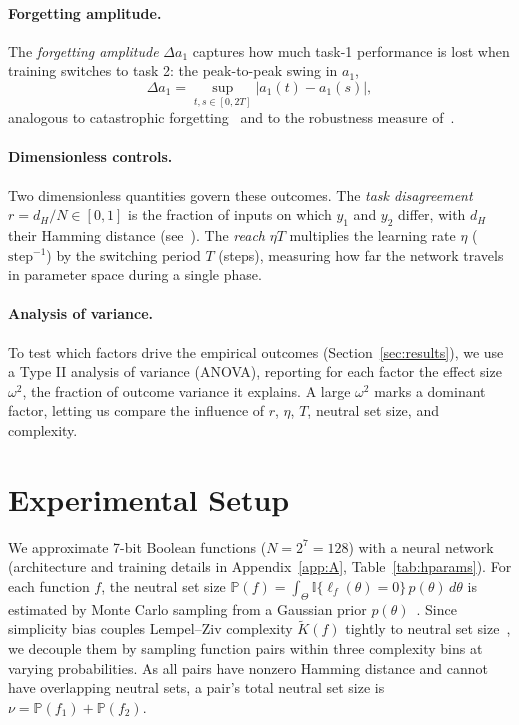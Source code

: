 \documentclass[pmlr]{jmlr} %
\begin{document}
\paragraph{Forgetting amplitude.} The \emph{forgetting amplitude} $\Delta a_1$ captures how much task-1 performance is lost when training switches to task 2: the peak-to-peak swing in $a_1$,
\[
    \Delta a_1 = \sup_{t,s\in[0,2T]}|a_1(t)-a_1(s)|,
\]
analogous to catastrophic forgetting~\citep{forgetting17,surgury20} and to the robustness measure of~\citet{PlasticGP}.

\paragraph{Dimensionless controls.} Two dimensionless quantities govern these outcomes. The \emph{task disagreement} $r=d_H/N\in[0,1]$ is the fraction of inputs on which $y_1$ and $y_2$ differ, with $d_H$ their Hamming distance (see~\citealp{hambook16}). The \emph{reach} $\eta T$ multiplies the learning rate $\eta$ ($\mathrm{step}^{-1}$) by the switching period $T$ (steps), measuring how far the network travels in parameter space during a single phase.

\paragraph{Analysis of variance.} To test which factors drive the empirical outcomes (Section~\ref{sec:results}), we use a Type II analysis of variance (ANOVA), reporting for each factor the effect size $\omega^2$, the fraction of outcome variance it explains. A large $\omega^2$ marks a dominant factor, letting us compare the influence of $r$, $\eta$, $T$, neutral set size, and complexity.

\section{Experimental Setup}

We approximate 7-bit Boolean functions ($N=2^7=128$) with a neural network (architecture and training details in Appendix~\ref{app:A}, Table~\ref{tab:hparams}). For each function $f$, the neutral set size $\mathbb{P}(f)=\int_\Theta \mathbb{I}\{\ell_f(\theta)=0\}\,p(\theta)\,d\theta$ is estimated by Monte Carlo sampling from a Gaussian prior $p(\theta)$~\citep{OcRazNN25, flatnessbad21}. Since simplicity bias couples Lempel--Ziv complexity $\tilde{K}(f)$ tightly to neutral set size~\citep{BoundP2018, OcRazNN25}, we decouple them by sampling function pairs within three complexity bins at varying probabilities. As all pairs have nonzero Hamming distance and cannot have overlapping neutral sets, a pair's total neutral set size is $\nu = \mathbb{P}(f_1) + \mathbb{P}(f_2)$.
\end{document}
